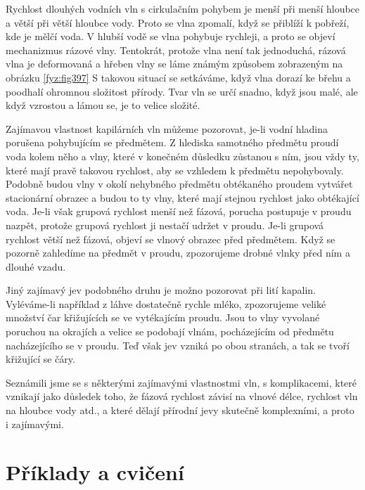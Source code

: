   Rychlost dlouhých vodních vln s cirkulačním pohybem je menší při menší hloubce a větší při větší 
  hloubce vody. Proto se vlna zpomalí, když se přiblíží k pobřeží, kde je mělčí voda. V hlubší vodě 
  se vlna pohybuje rychleji, a proto se objeví mechanizmus rázové vlny. Tentokrát, protože vlna 
  není tak jednoduchá, rázová vlna je deformovaná a hřeben vlny se láme známým způsobem zobrazeným 
  na obrázku \ref{fyz:fig397} S takovou situací se setkáváme, když vlna dorazí ke břehu a poodhalí 
  ohromnou složitost přírody. Tvar vln se určí snadno, když jsou malé, ale když vzrostou a lámou 
  se, je to velice složité. 
  
  Zajímavou vlastnost kapilárních vln můžeme pozorovat, je-li vodní hladina porušena pohybujícím se 
  předmětem. Z hlediska samotného předmětu proudí voda kolem něho a vlny, které v konečném důsledku 
  zůstanou s ním, jsou vždy ty, které mají pravě takovou rychlost, aby se vzhledem k předmětu 
  nepohybovaly. Podobně budou vlny v okolí nehybného předmětu obtékaného proudem vytvářet 
  stacionární obrazec a budou to ty vlny, které mají stejnou rychlost jako obtékající voda. Je-li 
  však grupová rychlost menší než fázová, porucha postupuje v proudu nazpět, protože grupová 
  rychlost ji nestačí udržet v proudu. Je-li grupová rychlost větší než fázová, objeví se vlnový 
  obrazec před předmětem. Když se pozorně zahledíme na předmět v proudu, zpozorujeme drobné vlnky 
  před ním a dlouhé vzadu. 
  
  Jiný zajímavý jev podobného druhu je možno pozorovat při lití kapalin. Vyléváme-li například z 
  láhve dostatečně rychle mléko, zpozorujeme veliké množství čar křižujících se ve vytékajícím 
  proudu. Jsou to vlny vyvolané poruchou na okrajích a velice se podobají vlnám, pocházejícím od 
  předmětu nacházejícího se v proudu. Teď však jev vzniká po obou stranách, a tak se tvoří 
  křižující se čáry. 
  
  Seznámili jsme se s některými zajímavými vlastnostmi vln, s komplikacemi, které vznikají jako 
  důsledek toho, že fázová rychlost závisí na vlnové délce, rychlost vln na hloubce vody atd., a 
  které dělají přírodní jevy skutečně komplexními, a proto i zajímavými.
  
\section{Příklady a cvičení}\label{fyz:IchapLIsecVI}
  



  
\printbibliography[title={Seznam literatury}, heading=subbibliography]
